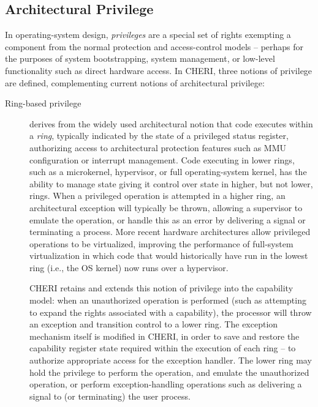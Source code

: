 \subsection{Architectural Privilege}

In operating-system design, {\em privileges} are a special set of rights
exempting a component from the normal protection and access-control models --
perhaps for the purposes of system bootstrapping, system management, or
low-level functionality such as direct hardware access.
In CHERI, three notions of privilege are defined, complementing current
notions of architectural privilege:

\begin{description}

\item[Ring-based privilege] derives from the widely used architectural notion
  that code executes within a \textit{ring}, typically indicated by the state
  of a privileged status register, authorizing access to architectural protection
  features such as MMU configuration or interrupt management.
  Code executing in lower rings, such as a microkernel, hypervisor, or full
  operating-system kernel, has the ability to manage state giving it control
  over state in higher, but not lower, rings.
  When a privileged operation is attempted in a higher ring, an architectural
  exception will typically be thrown, allowing a supervisor to emulate the
  operation, or handle this as an error by delivering a signal or terminating
  a process.
  More recent hardware architectures allow privileged operations to be
  virtualized, improving the performance of full-system virtualization in
  which code that would historically have run in the lowest ring (i.e., the OS
  kernel) now runs over a hypervisor.

  CHERI retains and extends this notion of privilege into the capability
  model: when an unauthorized operation is performed (such as attempting to
  expand the rights associated with a capability), the processor will throw an
  exception and transition control to a lower ring.
  The exception mechanism itself is modified in CHERI, in order to save and
  restore the capability register state required within the execution of each
  ring -- to authorize appropriate access for the exception handler.
  The lower ring may hold the privilege to perform the operation, and emulate
  the unauthorized operation, or perform exception-handling operations such
  as delivering a signal to (or terminating) the user process.


\end{description}
